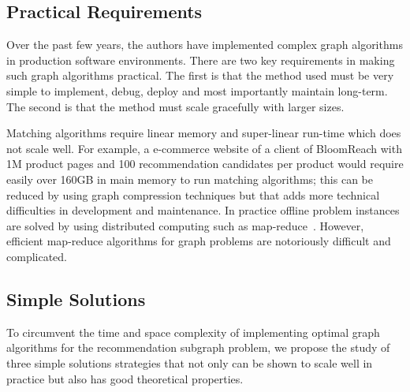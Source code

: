 \subsection{Practical Requirements}

Over the past few years, the authors have implemented complex graph algorithms in production software environments. 
There are two key requirements in making such graph algorithms
practical. The first is that the method used must be very simple to
implement, debug, deploy and most importantly maintain long-term. The second is that the method must scale
gracefully with larger sizes. \vs

Matching algorithms require linear memory and super-linear run-time
which does not scale well. For example, a
e-commerce website of a client of BloomReach with 1M product pages and 100 recommendation candidates per
product would require easily over 160GB in main memory to run matching
algorithms; this can be reduced by using graph compression techniques but that adds more technical difficulties in development and maintenance. In practice offline problem instances are solved by using distributed computing such as map-reduce~\cite{DeanGhemawat2004}. However, efficient map-reduce algorithms for graph problems are notoriously difficult and complicated. \vs

\subsection{Simple Solutions}

To circumvent the time and space complexity of implementing optimal graph algorithms for the recommendation subgraph problem, we propose the study of three simple solutions strategies that not only can be shown to scale well in practice but 
also has good theoretical properties. 

